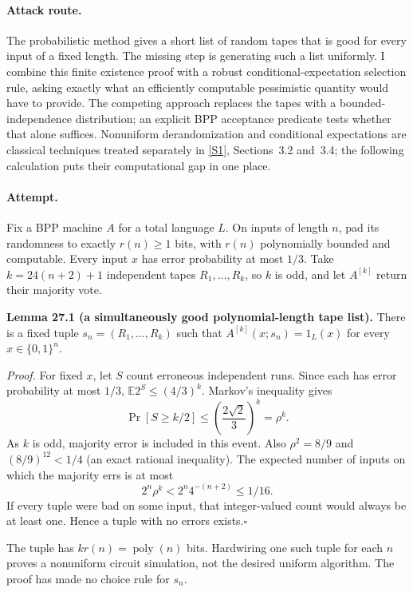 \documentclass[11pt,a4paper]{article}
\newcommand{\sref}[2]{\hyperlink{source:#1:#2}{[S#2]}}
\numberwithin{equation}{section}
\begin{document}
\paragraph{Attack route.}
The probabilistic method gives a short list of random tapes that is good
for every input of a fixed length. The missing step is generating such a
list uniformly. I combine this finite existence proof with a robust
conditional-expectation selection rule, asking exactly what an efficiently
computable pessimistic quantity would have to provide. The competing
approach replaces the tapes with a bounded-independence distribution;
an explicit BPP acceptance predicate tests whether that alone suffices.
Nonuniform derandomization and conditional expectations are classical
techniques treated separately in \sref{3405}{1}, Sections~3.2 and~3.4;
the following calculation puts their computational gap in one place.

\paragraph{Attempt.}
Fix a BPP machine $A$ for a total language $L$. On inputs of length $n$,
pad its randomness to exactly $r(n)\ge1$ bits, with $r(n)$ polynomially
bounded and computable. Every input $x$ has error probability at most
$1/3$. Take $k=24(n+2)+1$ independent tapes $R_1,\ldots,R_k$, so $k$ is
odd, and let $A^{[k]}$ return their majority vote.

\textbf{Lemma 27.1 (a simultaneously good polynomial-length tape list).}
There is a fixed tuple $s_n=(R_1,\ldots,R_k)$ such that
$A^{[k]}(x;s_n)=1_L(x)$ for every $x\in\{0,1\}^n$.

\emph{Proof.} For fixed $x$, let $S$ count erroneous independent runs.
Since each has error probability at most $1/3$,
$\mathbb E2^S\le(4/3)^k$. Markov's inequality gives
\[
 \Pr[S\ge k/2]\le\left(\frac{2\sqrt2}{3}\right)^k=\rho^k.
\]
As $k$ is odd, majority error is included in this event. Also
$\rho^2=8/9$ and $(8/9)^{12}<1/4$ (an exact rational inequality).
The expected number of inputs on which the majority errs is at most
\begin{equation}\label{r27:smallpotential}
       2^n\rho^k<2^n4^{-(n+2)}\le1/16.
\end{equation}
If every tuple were bad on some input, that integer-valued count would
always be at least one. Hence a tuple with no errors exists.\hfill$\square$

The tuple has $kr(n)=\operatorname{poly}(n)$ bits. Hardwiring one such
tuple for each $n$ proves a nonuniform circuit simulation, not the desired
uniform algorithm. The proof has made no choice rule for $s_n$.
\end{document}
